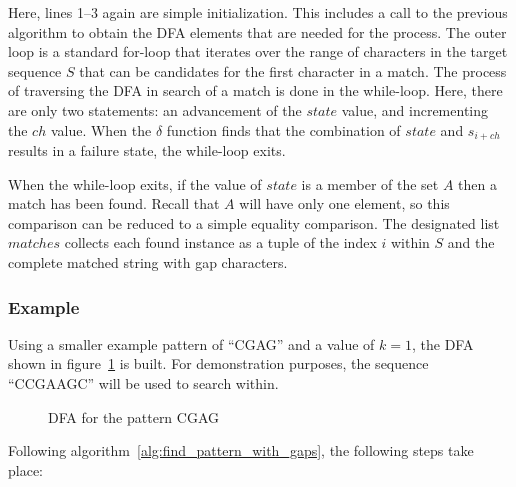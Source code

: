 Here, lines 1--3 again are simple initialization. This includes a call to the previous algorithm to obtain the DFA elements that are needed for the process. The outer loop is a standard for-loop that iterates over the range of characters in the target sequence $S$ that can be candidates for the first character in a match. The process of traversing the DFA in search of a match is done in the while-loop. Here, there are only two statements: an advancement of the $state$ value, and incrementing the $ch$ value. When the $\delta$ function finds that the combination of $state$ and $s_{i+ch}$ results in a failure state, the while-loop exits.

When the while-loop exits, if the value of $state$ is a member of the set $A$ then a match has been found. Recall that $A$ will have only one element, so this comparison can be reduced to a simple equality comparison. The designated list $matches$ collects each found instance as a tuple of the index $i$ within $S$ and the complete matched string with gap characters.

\subsubsection{Example}

Using a smaller example pattern of ``CGAG'' and a value of $k=1$, the DFA shown in figure~\ref{fig:dfa_example} is built. For demonstration purposes, the sequence ``CCGAAGC'' will be used to search within.

\begin{figure}[ht]
\centering

\caption{DFA for the pattern CGAG}
\label{fig:dfa_example}
\end{figure}

Following algorithm~\ref{alg:find_pattern_with_gaps}, the following steps take place:

